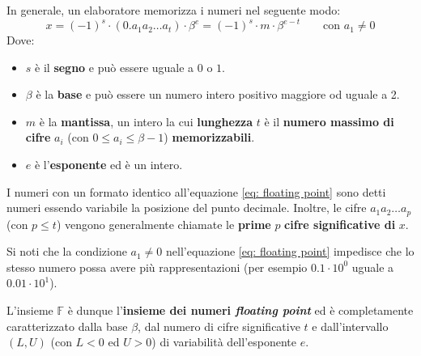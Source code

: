 \highspace
In generale, un elaboratore memorizza i numeri nel seguente modo:
\begin{equation}\label{eq: floating point}
    x = \left(-1\right)^{s} \cdot \left(0.a_{1}a_{2} \dots a_{t}\right) \cdot \beta^{e} = \left(-1\right)^{s} \cdot m \cdot \beta^{e-t} \hspace{2em} \text{con } a_{1} \ne 0
\end{equation}
Dove:
\begin{itemize}
    \item $s$ è il \textbf{segno} e può essere uguale a $0$ o $1$.
    \item $\beta$ è la \textbf{base} e può essere un numero intero positivo maggiore od uguale a 2.
    \item $m$ è la \textbf{mantissa}, un intero la cui \textbf{lunghezza} $t$ è il \textbf{numero massimo di cifre} $a_{i}$ (con $0 \le a_{i} \le \beta - 1$) \textbf{memorizzabili}.
    \item $e$ è l'\textbf{esponente} ed è un intero.
\end{itemize}
I numeri con un formato identico all'equazione \ref{eq: floating point} sono detti numeri  essendo variabile la posizione del punto decimale. Inoltre, le cifre $a_{1}a_{2} \dots a_{p}$ (con $p \le t$) vengono generalmente chiamate le \textbf{prime} $p$ \textbf{cifre significative di} $x$.

\highspace
Si noti che la condizione $a_{1} \ne 0$ nell'equazione \ref{eq: floating point} impedisce che lo stesso numero possa avere più rappresentazioni (per esempio $0.1 \cdot 10^{0}$ uguale a $0.01 \cdot 10^{1}$).

\highspace
L'insieme $\mathbb{F}$ è dunque l'\textbf{insieme dei numeri \emph{floating point}} ed è completamente caratterizzato dalla base $\beta$, dal numero di cifre significative $t$ e dall'intervallo $\left(L,U\right)$ (con $L < 0$ ed $U > 0$) di variabilità dell'esponente $e$.

